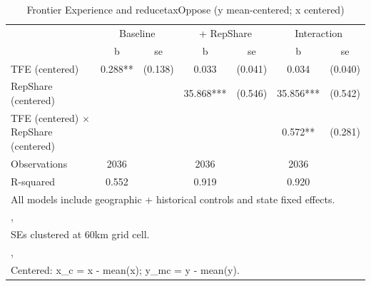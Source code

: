 \begin{table}[htbp]\centering
\def\sym#1{\ifmmode^{#1}\else\(^{#1}\)\fi}
\caption{Frontier Experience and reducetaxOppose (y mean-centered; x centered)}
\begin{tabular}{l*{3}{cc}}
\toprule
                &\multicolumn{2}{c}{Baseline}&\multicolumn{2}{c}{ + RepShare}&\multicolumn{2}{c}{Interaction}\\
                &        b   &       se&        b   &       se&        b   &       se\\
\midrule
TFE (centered)  &    0.288** &  (0.138)&    0.033   &  (0.041)&    0.034   &  (0.040)\\
RepShare (centered)&            &         &   35.868***&  (0.546)&   35.856***&  (0.542)\\
TFE (centered) $\times$ RepShare (centered)&            &         &            &         &    0.572** &  (0.281)\\
\midrule
Observations    &     2036   &         &     2036   &         &     2036   &         \\
R-squared       &    0.552   &         &    0.919   &         &    0.920   &         \\
\bottomrule
\multicolumn{7}{l}{\footnotesize All models include geographic + historical controls and state fixed effects.}\\
\multicolumn{7}{l}{\footnotesize ,}\\
\multicolumn{7}{l}{\footnotesize SEs clustered at 60km grid cell.}\\
\multicolumn{7}{l}{\footnotesize ,}\\
\multicolumn{7}{l}{\footnotesize Centered: x\_c = x - mean(x); y\_mc = y - mean(y).}\\
\end{tabular}
\end{table}
